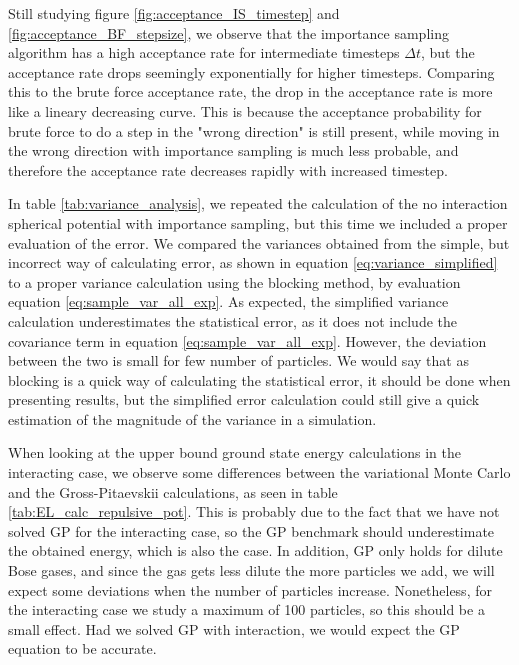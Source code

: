 \documentclass[norsk,a4paper,12pt]{article}
\begin{document}
Still studying figure \ref{fig:acceptance_IS_timestep} and \ref{fig:acceptance_BF_stepsize}, we observe that the importance sampling algorithm has a high acceptance rate for intermediate timesteps $\Delta t$, but the acceptance rate drops seemingly exponentially for higher timesteps. Comparing this to the brute force acceptance rate, the drop in the acceptance rate is more like a lineary decreasing curve. This is because the acceptance probability for brute force to do a step in the "wrong direction" is still present, while moving in the wrong direction with importance sampling is much less probable, and therefore the acceptance rate decreases rapidly with increased timestep.
\par 
\vspace{3mm}

In table \ref{tab:variance_analysis}, we repeated the calculation of the no interaction spherical potential with importance sampling, but this time we included a proper evaluation of the error. We compared the variances obtained from the simple, but incorrect way of calculating error, as shown in equation \ref{eq:variance_simplified} to a proper variance calculation using the blocking method, by evaluation equation \ref{eq:sample_var_all_exp}. As expected, the simplified variance calculation underestimates the statistical error, as it does not include the covariance term in equation \ref{eq:sample_var_all_exp}. However, the deviation between the two is small for few number of particles. We would say that as blocking is a quick way of calculating the statistical error, it should be done when presenting results, but the simplified error calculation could still give a quick estimation of the magnitude of the variance in a simulation.
\par 
\vspace{6mm}

When looking at the upper bound ground state energy calculations in the interacting case, we observe some differences between the variational Monte Carlo and the Gross-Pitaevskii calculations, as seen in table \ref{tab:EL_calc_repulsive_pot}. This is probably due to the fact that we have not solved GP for the interacting case, so the GP benchmark should underestimate the obtained energy, which is also the case. In addition, GP only holds for dilute Bose gases, and since the gas gets less dilute the more particles we add, we will expect some deviations when the number of particles increase. Nonetheless, for the interacting case we study a maximum of 100 particles, so this should be a small effect. Had we solved GP with interaction, we would expect the GP equation to be accurate. 
\end{document}
